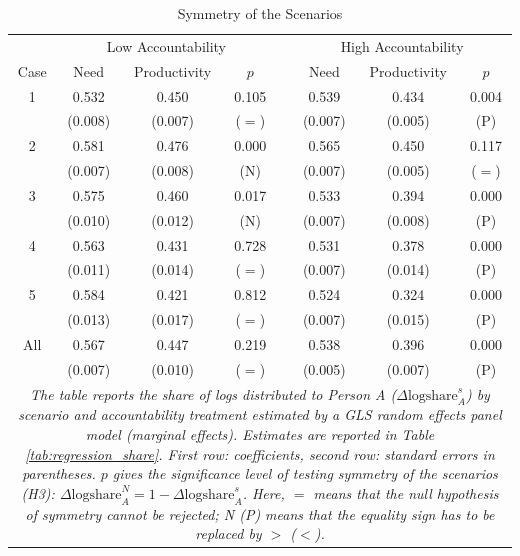 \documentclass[smallcondensed]{svjour3}
\begin{document}
\begin{table}[ht]
\centering
\caption{Symmetry of the Scenarios}\label{tab:symmetry}
{\footnotesize
\def\sym#1{\ifmmode^{#1}\else\(^{#1}\)\fi}
\begin{tabular}{cccccccc}\\[0.5ex]\hline
         & \multicolumn{3}{c}{Low Accountability}    &   & \multicolumn{3}{c}{High Accountability}   \\\cline{2-4}\cline{6-8}
   Case  & Need      & Productivity   & $p$          &   & Need      & Productivity & $p$            \\\hline\hline
   1     &  0.532    &  0.450         & 0.105        &   &  0.539    &  0.434    & 0.004             \\
         & (0.008)   & (0.007)        & ($=$)        &   & (0.007)   & (0.005)   & (P)               \\
   2     &  0.581    &  0.476         & 0.000        &   &  0.565    &  0.450    & 0.117             \\
         & (0.007)   & (0.008)        & (N)          &   & (0.007)   & (0.005)   & ($=$)             \\
   3     &  0.575    &  0.460         & 0.017        &   &  0.533    &  0.394    & 0.000             \\
         & (0.010)   & (0.012)        & (N)          &   & (0.007)   & (0.008)   & (P)               \\
   4     &  0.563    &  0.431         & 0.728        &   &  0.531    &  0.378    & 0.000             \\
         & (0.011)   & (0.014)        & ($=$)        &   & (0.007)   & (0.014)   & (P)               \\
   5     &  0.584    &  0.421         & 0.812        &   &  0.524    &  0.324    & 0.000             \\
         & (0.013)   & (0.017)        & ($=$)        &   & (0.007)   & (0.015)   & (P)               \\\hline
   All   &  0.567    &  0.447         & 0.219        &   &  0.538    &  0.396    & 0.000             \\
         & (0.007)   & (0.010)        & ($=$)        &   & (0.005)   & (0.007)   & (P)               \\\hline
\multicolumn{8}{p{12cm}}{\footnotesize{\textit{The table reports the share of logs distributed to Person A ($\Delta\mbox{logshare}_A^s$) by scenario and accountability treatment estimated by a GLS random effects panel model (marginal effects). Estimates are reported in Table \ref{tab:regression_share}. First row: coefficients, second row: standard errors in parentheses. $p$ gives the significance level of testing symmetry of the scenarios (H3): $\Delta\mbox{logshare}_A^N=1-\Delta\mbox{logshare}_A^s$. Here, $=$ means that the null hypothesis of symmetry cannot be rejected; N (P) means that the equality sign has to be replaced by $>$ ($<$).}}}
\end{tabular}
}
\end{table}
\end{document}

